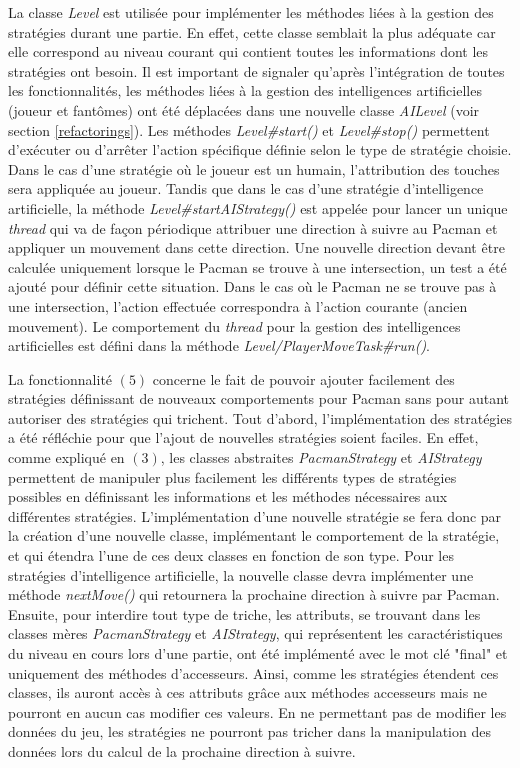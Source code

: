\documentclass[12pt, openany]{report}
\begin{document}
La classe \mbox{\textit{Level}} est utilisée pour implémenter les méthodes liées à la gestion des stratégies durant une partie. En effet, cette classe semblait la plus adéquate car elle correspond au niveau courant qui contient toutes les informations dont les stratégies ont besoin. Il est important de signaler qu'après l'intégration de toutes les fonctionnalités, les méthodes liées à la gestion des intelligences artificielles (joueur et fantômes) ont été déplacées dans une nouvelle classe \mbox{\textit{AILevel}} (voir section \ref{refactorings}). Les méthodes \mbox{\textit{Level\#start()}} et \mbox{\textit{Level\#stop()}} permettent d'exécuter ou d'arrêter l'action spécifique définie selon le type de stratégie choisie. Dans le cas d'une stratégie où le joueur est un humain, l'attribution des touches sera appliquée au joueur. Tandis que dans le cas d'une stratégie d'intelligence artificielle, la méthode \mbox{\textit{Level\#startAIStrategy()}} est appelée pour lancer un unique \textit{thread} qui va de façon périodique attribuer une direction à suivre au Pacman et appliquer un mouvement dans cette direction. Une nouvelle direction devant être calculée uniquement lorsque le Pacman se trouve à une intersection, un test a été ajouté pour définir cette situation. Dans le cas où le Pacman ne se trouve pas à une intersection, l'action effectuée correspondra à l'action courante (ancien mouvement). Le comportement du \textit{thread} pour la gestion des intelligences artificielles est défini dans la méthode \mbox{\textit{Level/PlayerMoveTask\#run()}}.


La fonctionnalité $(5)$ concerne le fait de pouvoir ajouter facilement des stratégies définissant de nouveaux comportements pour Pacman sans pour autant autoriser des stratégies qui trichent. Tout d'abord, l'implémentation des stratégies a été réfléchie pour que l'ajout de nouvelles stratégies soient faciles. En effet, comme expliqué en $(3)$, les classes abstraites \mbox{\textit{PacmanStrategy}} et \mbox{\textit{AIStrategy}} permettent de manipuler plus facilement les différents types de stratégies possibles en définissant les informations et les méthodes nécessaires aux différentes stratégies. L'implémentation d'une nouvelle stratégie se fera donc par la création d'une nouvelle classe, implémentant le comportement de la stratégie, et qui étendra l'une de ces deux classes en fonction de son type. Pour les stratégies d'intelligence artificielle, la nouvelle classe devra implémenter une méthode \mbox{\textit{nextMove()}} qui retournera la prochaine direction à suivre par Pacman. Ensuite, pour interdire tout type de triche, les attributs, se trouvant dans les classes mères \mbox{\textit{PacmanStrategy}} et \mbox{\textit{AIStrategy}}, qui représentent les caractéristiques du niveau en cours lors d'une partie, ont été implémenté avec le mot clé "final" et uniquement des méthodes d'accesseurs. Ainsi, comme les stratégies étendent ces classes, ils auront accès à ces attributs grâce aux méthodes accesseurs mais ne pourront en aucun cas modifier ces valeurs. En ne permettant pas de modifier les données du jeu, les stratégies ne pourront pas tricher dans la manipulation des données lors du calcul de la prochaine direction à suivre.
\end{document}
